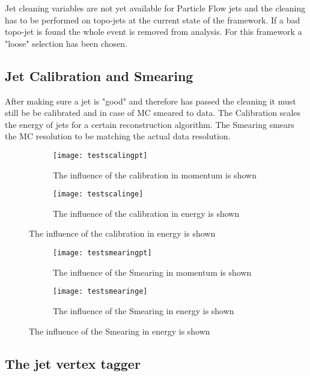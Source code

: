 Jet cleaning variables are not yet available for Particle Flow jets and the cleaning has to be performed on topo-jets at the current state of the framework. If a bad topo-jet is found the whole event is removed from analysis.
For this framework a "loose" selection has been chosen.

\subsection{Jet Calibration and Smearing}

After making sure a jet is "good" and therefore has passed the cleaning it must still be be calibrated and in case of MC smeared to data. The Calibration scales the energy of jets for a certain reconstruction algorithm. The Smearing smears the MC resolution to be matching the actual data resolution.


\begin{figure}
\centering
\begin{subfigure}[b]{0.5\figwidth}
\texttt{[image: testscalingpt]}
\caption[Influence of the JES on the transversal momentum]{The influence of the calibration in momentum is shown}
\label{fig:testscalingpt}
\end{subfigure}
\quad
\begin{subfigure}[b]{0.5\figwidth}
\texttt{[image: testscalinge]}
\caption[Influence of the JES on the energy]{The influence of the calibration in energy is shown}
\label{fig:testscalinge}
\end{subfigure}
\end{figure}


\begin{figure}
\centering
\begin{subfigure}[b]{0.5\figwidth}
\texttt{[image: testsmearingpt]}
\caption[Influence of the Smearing on the transversal momentum]{The influence of the Smearing in momentum is shown}
\label{fig:testsmearingpt}
\end{subfigure}
\quad
\begin{subfigure}[b]{0.5\figwidth}
\texttt{[image: testsmearinge]}
\caption[Influence of the Smearing on the energy]{The influence of the Smearing in energy is shown}
\label{fig:testsmearinge}
\end{subfigure}
\end{figure}


\subsection{The jet vertex tagger}

